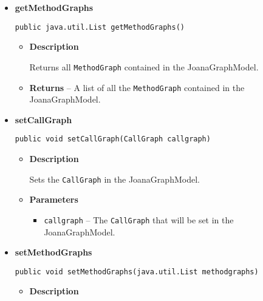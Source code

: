 {{{{{{{{{{{{{{\begin{itemize}
{\begin{itemize}
{Returns all \texttt{\small Graph}{\small 
{}} contained in the GraphModel.
}
\item{{\bf  Returns} -- 
A list of all the \texttt{\small Graph}{\small 
{}} contained in the GraphModel. 
}%
\end{itemize}
}%
\item{ 
{\bf  getMethodGraphs}\\
\begin{lstlisting}[frame=none]
public java.util.List getMethodGraphs()\end{lstlisting} %
\begin{itemize}
\item{
{\bf  Description}

Returns all \texttt{\small MethodGraph}{\small 
{}} contained in the JoanaGraphModel.
}
\item{{\bf  Returns} -- 
A list of all the \texttt{\small MethodGraph}{\small 
{}} contained in the JoanaGraphModel. 
}%
\end{itemize}
}%
\item{ 
{\bf  setCallGraph}\\
\begin{lstlisting}[frame=none]
public void setCallGraph(CallGraph callgraph)\end{lstlisting} %
\begin{itemize}
\item{
{\bf  Description}

Sets the \texttt{\small CallGraph}{\small 
{}} in the JoanaGraphModel.
}
\item{
{\bf  Parameters}
  \begin{itemize}
   \item{
\texttt{callgraph} -- The \texttt{\small CallGraph}{\small 
{}} that will be set in the JoanaGraphModel.}
  \end{itemize}
}%
\end{itemize}
}%
\item{ 
{\bf  setMethodGraphs}\\
\begin{lstlisting}[frame=none]
public void setMethodGraphs(java.util.List methodgraphs)\end{lstlisting} %
\begin{itemize}
\item{
{\bf  Description}

}
\end{itemize}}
\end{itemize}}}}}}}}}}}}}}}
